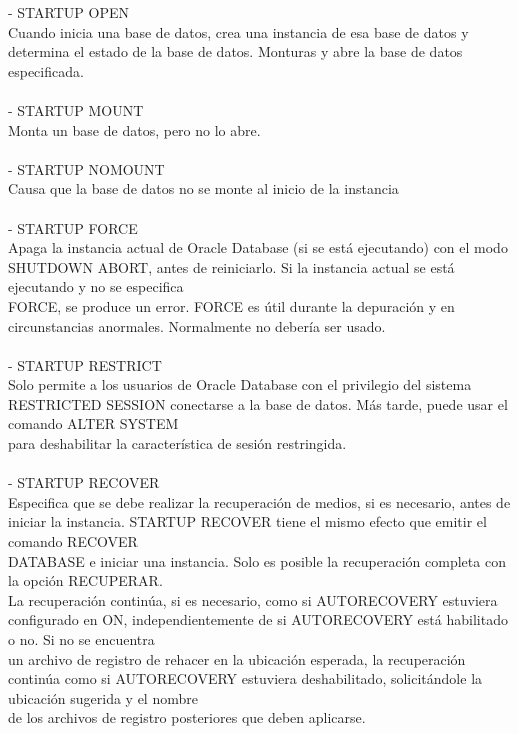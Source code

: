 \begin{enumerate}[1.]
	- STARTUP OPEN 
	\\Cuando inicia una base de datos, crea una instancia de esa base de datos y determina el estado de la base de datos. Monturas y abre la base de datos especificada.
	\\
	\\- STARTUP MOUNT 
	\\Monta un base de datos, pero no lo abre.
	\\
	\\- STARTUP NOMOUNT 
	\\Causa que la base de datos no se monte al inicio de la instancia 
	\\
	\\- STARTUP FORCE 
	\\Apaga la instancia actual de Oracle Database (si se est\'a ejecutando) con el modo SHUTDOWN ABORT, antes de reiniciarlo. Si la instancia actual se est\'a ejecutando y no se especifica 
	\\FORCE, se produce un error. FORCE es útil durante la depuración y en circunstancias anormales. Normalmente no debería ser usado.
	\\
	\\- STARTUP RESTRICT 
	\\Solo permite a los usuarios de Oracle Database con el privilegio del sistema RESTRICTED SESSION conectarse a la base de datos. M\'as tarde, puede usar el comando ALTER SYSTEM 
	\\para deshabilitar la caracter\'istica de sesi\'on restringida.
	\\
	\\- STARTUP RECOVER 
	\\Especifica que se debe realizar la recuperación de medios, si es necesario, antes de iniciar la instancia. STARTUP RECOVER tiene el mismo efecto que emitir el comando RECOVER
	 \\DATABASE e iniciar una instancia. Solo es posible la recuperaci\'on completa con la opci\'on RECUPERAR.
	\\La recuperaci\'on contin\'ua, si es necesario, como si AUTORECOVERY estuviera configurado en ON, independientemente de si AUTORECOVERY est\'a habilitado o no. Si no se encuentra 
	\\un archivo de registro de rehacer en la ubicaci\'on esperada, la recuperaci\'on contin\'ua como si AUTORECOVERY estuviera deshabilitado, solicit\'andole la ubicaci\'on sugerida y el nombre 
	\\de los archivos de registro posteriores que deben aplicarse.
	\\

\end{enumerate}
